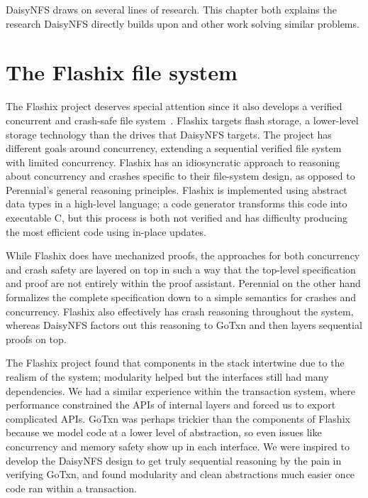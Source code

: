 DaisyNFS draws on several lines of research. This chapter both explains the
research DaisyNFS directly builds upon and other work solving similar problems.

\resume

\section{The Flashix file system}

The Flashix project deserves special attention since it also develops a verified
concurrent and crash-safe file system~\cite{bodenmuller:concurrent-flashix}.
Flashix targets flash storage, a lower-level storage technology than the drives
that DaisyNFS targets. The project has different goals around concurrency,
extending a sequential verified file system with limited concurrency. Flashix
has an idiosyncratic approach to reasoning about concurrency and crashes
specific to their file-system design, as opposed to Perennial's general
reasoning principles. Flashix is implemented using abstract data types in a
high-level language; a code generator transforms this code into executable C,
but this process is both not verified and has difficulty producing the most
efficient code using in-place updates.

While Flashix does have mechanized proofs, the approaches for both concurrency
and crash safety are layered on top in such a way that the top-level
specification and proof are not entirely within the proof assistant. Perennial
on the other hand formalizes the complete specification down to a simple
semantics for crashes and concurrency. Flashix also effectively has crash
reasoning throughout the system, whereas DaisyNFS factors out this reasoning to
GoTxn and then layers sequential proofs on top.

The Flashix project found that components in the stack intertwine due to the
realism of the system; modularity helped but the interfaces still had many
dependencies. We had a similar experience within the transaction system, where
performance constrained the APIs of internal layers and forced us to export
complicated APIs. GoTxn was perhaps trickier than the components of Flashix
because we model code at a lower level of abstraction, so even issues like
concurrency and memory safety show up in each interface. We were inspired to
develop the DaisyNFS design to get truly sequential reasoning by the pain in
verifying GoTxn, and found modularity and clean abstractions much easier once
code ran within a transaction.

